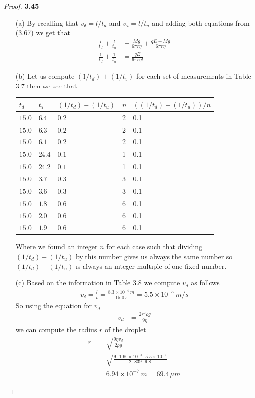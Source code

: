 \documentclass[11pt]{article}
\theoremstyle{definition}
\begin{document}
\begin{proof}{\textbf{3.45}}
\begin{itemize}
    \item [(a)] By recalling that $v_d = l/t_d$ and $v_u = l/t_u$ and adding
    both equations from (3.67) we get that
    \begin{align*}
        \frac{l}{t_d} + \frac{l}{t_u}
        &= \frac{Mg}{6\pi r\eta} + \frac{qE - Mg}{6\pi r\eta}\\
        \frac{1}{t_d} + \frac{1}{t_u}
        &= \frac{qE}{6\pi r\eta l}
    \end{align*}
    \item [(b)] Let us compute $(1/t_d) + (1/t_u)$ for each set of measurements
    in Table 3.7 then we see that
    \begin{center}
        \begin{tabular}{|l|l|l|l|l|}
        \hline
        $t_d$  & $t_u$  & $(1/t_d) + (1/t_u)$ & $n$ & $((1/t_d) + (1/t_u))/n$\\\hline
        $15.0$ & $6.4$  & $0.2$ & 2 & 0.1 \\ \hline
        $15.0$ & $6.3$  & $0.2$ & 2 & 0.1 \\ \hline
        $15.0$ & $6.1$  & $0.2$ & 2 & 0.1 \\ \hline
        $15.0$ & $24.4$ & $0.1$ & 1 & 0.1\\ \hline
        $15.0$ & $24.2$ & $0.1$ & 1 & 0.1\\ \hline
        $15.0$ & $3.7$  & $0.3$ & 3 & 0.1\\ \hline
        $15.0$ & $3.6$  & $0.3$ & 3 & 0.1\\ \hline
        $15.0$ & $1.8$  & $0.6$ & 6 & 0.1\\ \hline
        $15.0$ & $2.0$  & $0.6$ & 6 & 0.1\\ \hline
        $15.0$ & $1.9$  & $0.6$ & 6 & 0.1\\ \hline
    \end{tabular}
    \end{center}
    Where we found an integer $n$ for each case such that dividing
    $(1/t_d) + (1/t_u)$ by this number gives us always the same number so
    $(1/t_d) + (1/t_u)$ is always an integer multiple of one fixed number.

    \item [(c)] Based on the information in Table 3.8 we compute $v_d$
    as follows
    \begin{align*}
        v_d = \frac{l}{t} = \frac{8.3 \times 10^{-4}~m}{15.0~s}
        = 5.5\times 10^{-5}~m/s
    \end{align*}
    So using the equation for $v_d$
    \begin{align*}
        v_d &= \frac{2r^2 \rho g}{9\eta}
    \end{align*}
    we can compute the radius $r$ of the droplet
    \begin{align*}
        r &= \sqrt{\frac{9\eta v_d}{2 \rho g}}\\
        &= \sqrt{\frac{9 \cdot 1.60 \times 10^{-5} \cdot 5.5\times 10^{-5}}
        {2 \cdot 839 \cdot 9.8}}\\
        &= 6.94 \times 10^{-7}~m = 69.4~\mu m
    \end{align*}


\end{itemize}
\end{proof}
\end{document}
